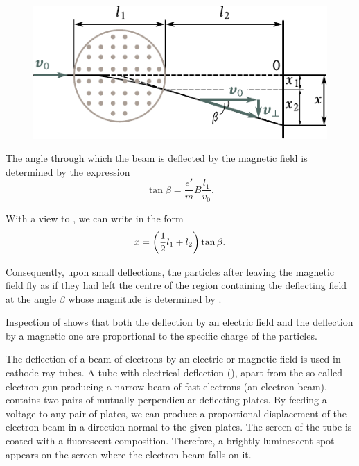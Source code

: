 \begin{figure}[t]
	\begin{center}
		\includegraphics[scale=0.98]{figures/ch_10/fig_10_4.pdf}
		\caption[]{}
		\label{fig:10_4}
	\end{center}
	\vspace{-0.85cm}
\end{figure}

The angle through which the beam is deflected by the magnetic field is determined by the expression
\begin{equation}\label{eq:10_9}
    \tan\beta = \frac{e'}{m} B \frac{l_1}{v_0}.
\end{equation}

\noindent
With a view to , we can write  in the form
\begin{equation*}
    x = \left(\frac{1}{2} l_1 + l_2\right) \tan\beta.
\end{equation*}

\noindent
Consequently, upon small deflections, the particles after leaving the magnetic field fly as if they had left the centre of the region containing the deflecting field at the angle $\beta$ whose magnitude is determined by .

Inspection of  shows that both the deflection by an electric field and the deflection by a magnetic one are proportional to the specific charge of the particles.

The deflection of a beam of electrons by an electric or magnetic field is used in cathode-ray tubes.
A tube with electrical deflection (), apart from the so-called electron gun producing a narrow beam of fast electrons (an electron beam), contains two pairs of mutually perpendicular deflecting plates.
By feeding a voltage to any pair of plates, we can produce a proportional displacement of the electron beam in a direction normal to the given plates.
The screen of the tube is coated with a fluorescent composition.
Therefore, a brightly luminescent spot appears on the screen where the electron beam falls on it.

